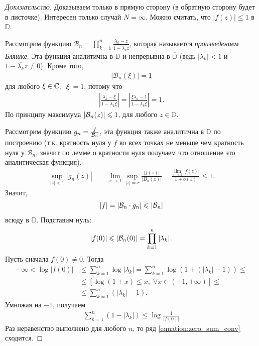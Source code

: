 \documentclass[../complex-analysis.tex]{subfiles}
\begin{document}
\begin{proof}[\normalfont\textsc{Доказательство}]
 Доказываем только в прямую сторону (в обратную сторону будет в листочке). Интересен только случай $ N = \infty $. Можно считать, что $ \left| f(z) \right| \leqslant 1$ в $ \mathbb D $.

 Рассмотрим функцию $ \mathcal B_n = \prod_{k=1}^{n} \frac{\lambda_k - z}{1 - \overline{\lambda_k}z} $, которая называется \textit{произведением Бляшке}. Эта функция аналитична в $ \mathbb D  $ и непрерывна в $ \overline {\mathbb D} $ (ведь $ \left| \lambda_k \right| < 1  $ и $ 1 - \overline{\lambda_k}z \neq 0 $). Кроме того,
 \begin{align*}
  \left| \mathcal B_n(\xi) \right| = 1
 \end{align*} для любого $ \xi \in \mathbb{C} $, $ \left| \xi \right| = 1 $, потому что
 \begin{align*}
  \left| \frac{\lambda_k - \xi}{1 - \overline{\lambda_k}\xi} \right| = \left| \frac{\overline \xi \lambda_k - 1}{1 - \overline{\lambda_k} \xi} \right| = 1.
 \end{align*} По принципу максимума $ \left| \mathcal{B}_n(z) \right| \leqslant 1$, для любого $z \in \mathbb D $.

 Рассмотрим функцию $ g_n = \frac{f}{\mathcal{B}_n} $, эта функция также аналитична в $ \mathbb D $ по построению (т.к. кратность нуля у $f$ во всех точках не меньше чем кратность нуля у $\mathcal B_n$, значит по лемме о кратности нуля получаем что отношение это аналитическая функция).
 \begin{align*}
	 \sup_{\left| z \right| < 1} \left| g_n(z) \right| &= \lim_{r \to 1} \sup_{\left| z \right| = r} \frac{\left|f(z) \right|}{\left| B_n(z) \right|} =  \frac{ \lim_{r \to 1}\left| f(z) \right|}{1 + o(1)} \leqslant 1.
 \end{align*} Значит,
 \begin{align*}
  \left| f \right| = \left| \mathcal B_n \cdot g_n \right| \leqslant \left| \mathcal{B}_n \right|
 \end{align*} всюду в $ \mathbb D $. Подставим нуль:
 \begin{align*}
  \left| f(0) \right| \leqslant \left| \mathcal{B}_n(0) \right| = \prod_{k=1}^{n}\left| \lambda_k \right|.
 \end{align*} Пусть сначала $ f(0) \neq 0 $. Тогда
 \begin{align*}
	-\infty < \log \left| f(0) \right| &\leqslant \sum_{k=1}^{n} \log \left| \lambda_k \right| = \sum_{k=1}^{n} \log (1 + (\left| \lambda_k \right| - 1)) \leqslant \\
	&\leqslant [\log(1+x) \leqslant x, \; \forall  x \in (-1, +\infty)  ] \leqslant \\
	&\leqslant \sum_{k=1}^{n}\left( \left| \lambda_k \right| - 1 \right).
 \end{align*} Умножая на $ -1 $, получаем
 \begin{align*}
  \sum_{k=1}^{n} \left( 1 - \left| \lambda_k \right| \right) \leqslant \log \frac{1}{\left| f(0) \right|}
 \end{align*} Раз неравенство выполнено для любого $ n $, то ряд  \eqref{equation:zero_sum_conv} сходится.


\end{proof}
\end{document}
